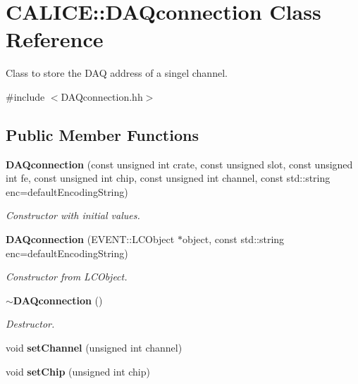 \section{CALICE::DAQconnection Class Reference}
\label{classCALICE_1_1DAQconnection}


Class to store the DAQ address of a singel channel.  


{\ttfamily \#include $<$DAQconnection.hh$>$}\subsection*{Public Member Functions}
\begin{DoxyCompactItemize}
\item 
{\bf DAQconnection} (const unsigned int crate, const unsigned slot, const unsigned int fe, const unsigned int chip, const unsigned int channel, const std::string enc=defaultEncodingString)\label{classCALICE_1_1DAQconnection_a1683f388c10013e8c435262de9c2b0a7}

\begin{DoxyCompactList}\small\item\em Constructor with initial values. \item\end{DoxyCompactList}\item 
{\bf DAQconnection} (EVENT::LCObject $\ast$object, const std::string enc=defaultEncodingString)\label{classCALICE_1_1DAQconnection_a7f6a1f3e76fe54b0f952cccf01b2b489}

\begin{DoxyCompactList}\small\item\em Constructor from LCObject. \item\end{DoxyCompactList}\item 
{\bf $\sim$DAQconnection} ()\label{classCALICE_1_1DAQconnection_aab804c279b14b7139378825152f5d7af}

\begin{DoxyCompactList}\small\item\em Destructor. \item\end{DoxyCompactList}\item 
void {\bfseries setChannel} (unsigned int channel)\label{classCALICE_1_1DAQconnection_abc3d2a36439898873d04493ade4e2b79}

\item 
void {\bfseries setChip} (unsigned int chip)\label{classCALICE_1_1DAQconnection_aa8749c6e343d3703cfd036a8a19851c8}


\end{DoxyCompactItemize}
